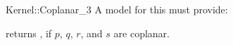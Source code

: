 \begin{ccRefFunctionObjectConcept}{Kernel::Coplanar_3}
A model for this must provide:


{returns , if $p$, $q$, $r$, and $s$ are coplanar.}

\end{ccRefFunctionObjectConcept}
